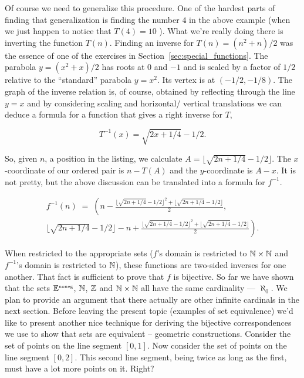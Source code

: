 Of course we need to generalize this procedure.  One of the hardest parts
of finding that generalization is finding the number $4$ in the above example
(when we just happen to notice that $T(4)=10$ ).  What we're really doing
there is inverting the function $T(n)$.  Finding an inverse for 
$T(n) = (n^2+n)/2$ was the essence of one of the exercises in 
Section~\ref{sec:special_functions}.  
The parabola $y = (x^2 + x)/2$ has roots at $0$ and $-1$ and is scaled by a
factor of $1/2$ relative to the ``standard'' parabola $y = x^2$.  
Its vertex is at
$(-1/2,-1/8)$.  The graph of the inverse relation is, of course, obtained by
reflecting through the line $y = x$ and by considering scaling and horizontal/
vertical translations we can deduce a formula for a function that gives a
right inverse for $T$, 

\[ T^{-1}(x) = \sqrt{2x + 1/4} - 1/2. \]

So, given $n$, a position in the listing, we calculate $A = \lfloor \sqrt{2n + 1/4}-1/2 \rfloor$.  The $x$-coordinate of our ordered pair is $n-T(A)$ 
and the $y$-coordinate is $A-x$.  
It is not pretty, but the above discussion can be translated into a formula
for $f^{-1}$.

\begin{gather*}
f^{-1}(n) \; = \; \left( n - \frac{ \lfloor \sqrt{2n + 1/4} - 1/2 \rfloor^2 + \lfloor \sqrt{2n + 1/4} - 1/2 \rfloor}{2} , \right. \\
\left. \lfloor \sqrt{2n + 1/4} - 1/2  \rfloor - n + \frac{\lfloor \sqrt{2n + 1/4} - 1/2 \rfloor^2 + \lfloor \sqrt{2n + 1/4} - 1/2 \rfloor}{2} \right).
\end{gather*}

When restricted to the appropriate sets ($f$'s domain 
is restricted to ${\mathbb N} \times {\mathbb N}$
and $f^{-1}$'s domain is restricted to ${\mathbb N}$), 
these functions are two-sided inverses
for one another.  That fact is sufficient to prove that $f$ 
is bijective.  
So far we have shown that the sets ${\mathbb E}^{\mbox{\tiny noneg}}$, ${\mathbb N}$, ${\mathbb Z}$ and 
${\mathbb N} \times {\mathbb N}$ all have
the same cardinality ---  $\aleph_0$.  We plan to provide an argument that there
actually are other infinite cardinals in the next section.  Before leaving the
present topic (examples of set equivalence) we'd like to present another nice
technique for deriving the bijective correspondences we use to show that sets
are equivalent -- geometric constructions.
Consider the set of points on the line segment $[0, 1]$. 
Now consider the set
of points on the line segment $[0, 2]$.  This second line 
segment, being twice as
long as the first, must have a lot more points on it.  Right?

